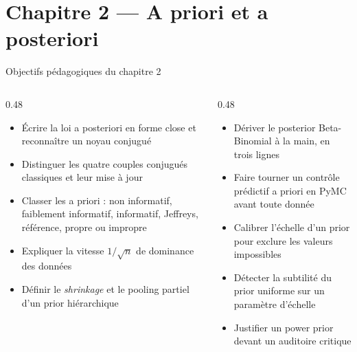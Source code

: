 \section{Chapitre 2 --- A priori et a posteriori}

\begin{frame}{Objectifs pédagogiques du chapitre 2}
\begin{columns}[t]
\begin{column}{0.48\textwidth}
\begin{kbox}[Savoirs]
\begin{itemize}
  \item Écrire la loi a posteriori en forme close et reconnaître un noyau conjugué
  \item Distinguer les quatre couples conjugués classiques et leur mise à jour
  \item Classer les a priori : non informatif, faiblement informatif, informatif,
        Jeffreys, référence, propre ou impropre
  \item Expliquer la vitesse $1/\sqrt{n}$ de dominance des données
  \item Définir le \emph{shrinkage} et le pooling partiel d'un prior hiérarchique
\end{itemize}
\end{kbox}
\end{column}
\begin{column}{0.48\textwidth}
\begin{abox}
\begin{itemize}
  \item Dériver le posterior Beta-Binomial à la main, en trois lignes
  \item Faire tourner un contrôle prédictif a priori en PyMC avant toute donnée
  \item Calibrer l'échelle d'un prior pour exclure les valeurs impossibles
  \item Détecter la subtilité du prior uniforme sur un paramètre d'échelle
  \item Justifier un power prior devant un auditoire critique
\end{itemize}
\end{abox}
\end{column}
\end{columns}
\vspace{2mm}
\end{frame}

